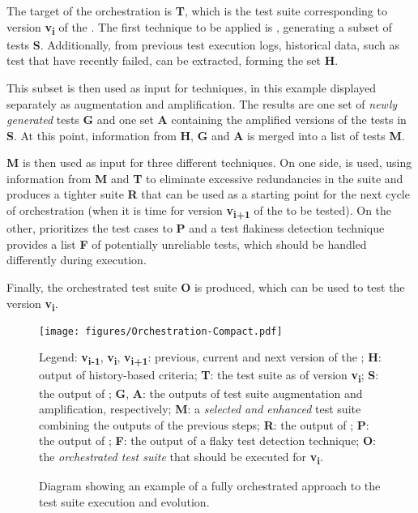 The target of the orchestration is \textbf{T}, which is the test suite corresponding to version \textbf{v\textsubscript{i}} of the \sut.
The first technique to be applied is \tcs, generating a subset of tests \textbf{S}.
Additionally, from previous test execution logs, historical data, such as test that have recently failed, can be extracted, forming the set \textbf{H}.

This subset is then used as input for \tsa techniques, in this example displayed separately as augmentation and amplification.
The results are one set of \textit{newly generated} tests \textbf{G} and one set \textbf{A} containing the amplified versions of the tests in \textbf{S}.
At this point, information from \textbf{H}, \textbf{G} and \textbf{A} is merged into a list of tests \textbf{M}.

\textbf{M} is then used as input for three different techniques.
On one side, \tsr is used, using information from \textbf{M} and \textbf{T} to eliminate excessive redundancies in the suite and produces a tighter suite \textbf{R} that can be used as a starting point for the next cycle of orchestration (when it is time for version \textbf{v\textsubscript{i+1}} of the \sut to be tested).
On the other, \tcp prioritizes the test cases to \textbf{P} and a test flakiness detection technique provides a list \textbf{F} of potentially unreliable tests, which should be handled differently during execution.

Finally, the orchestrated test suite \textbf{O} is produced, which can be used to test the \sut version \textbf{v\textsubscript{i}}.


\begin{figure*}[h]
  \centering
  \texttt{[image: figures/Orchestration-Compact.pdf]}
  \begin{flushleft}
	\footnotesize Legend: 
	\textbf{v\textsubscript{i-1}}, \textbf{v\textsubscript{i}}, \textbf{v\textsubscript{i+1}}: previous, current and next version of the \sut; 
	\textbf{H}: output of history-based criteria;
	\textbf{T}: the test suite as of version \textbf{v\textsubscript{i}};
	\textbf{S}: the output of \tcs;
	\textbf{G}, \textbf{A}: the outputs of test suite augmentation and amplification, respectively;
	\textbf{M}: a \textit{selected and enhanced} test suite combining the outputs of the previous steps;
	\textbf{R}: the output of \tsr;
	\textbf{P}: the output of \tcp;
	\textbf{F}: the output of a flaky test detection technique;
	\textbf{O}: the \textit{orchestrated test suite} that should be executed for \textbf{v\textsubscript{i}}.
  \end{flushleft}
  \caption{Diagram showing an example of a fully orchestrated approach to the test suite execution and evolution.}
  \label{fig:orchestration}
\end{figure*}

